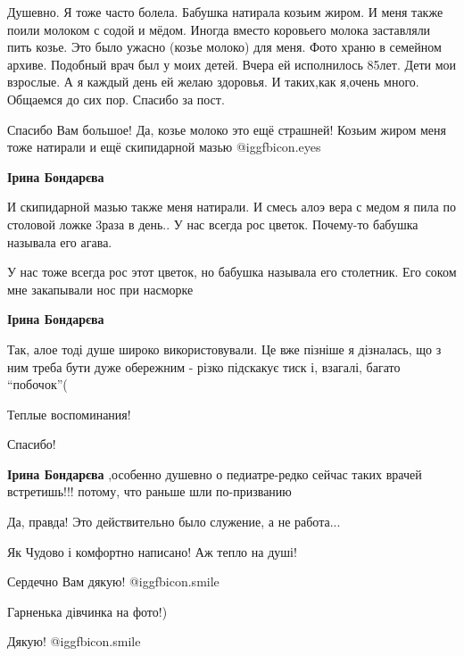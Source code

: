 \begin{itemize}
Душевно. Я тоже часто болела. Бабушка натирала козьим жиром. И меня также поили
молоком с содой и мёдом. Иногда вместо коровьего молока заставляли пить козье.
Это было ужасно (козье молоко) для меня. Фото храню в семейном архиве. Подобный
врач был у моих детей. Вчера ей исполнилось 85лет. Дети мои взрослые. А я
каждый день ей желаю здоровья. И таких,как я,очень много. Общаемся до сих пор.
Спасибо за пост.

\begin{itemize} %

Спасибо Вам большое! Да, козье молоко это ещё страшней! Козьим жиром меня тоже
натирали и ещё скипидарной мазью  @igg{fbicon.eyes} 

\textbf{Ірина Бондарєва} 

И скипидарной мазью также меня натирали. И смесь алоэ вера с медом я пила по
столовой ложке 3раза в день.. У нас всегда рос цветок. Почему-то бабушка
называла его агава.


У нас тоже всегда рос этот цветок, но бабушка называла его столетник. Его соком
мне закапывали нос при насморке

\textbf{Ірина Бондарєва} 

Так, алое тоді душе широко використовували. Це вже пізніше я дізналась, що з
ним треба бути дуже обережним - різко підскакує тиск і, взагалі, багато
\enquote{побочок}(

\end{itemize} %

Теплые воспоминания!

\begin{itemize} %
Спасибо!

\textbf{Ірина Бондарєва} ,особенно душевно о педиатре-редко сейчас таких врачей встретишь!!! потому, что раньше шли по-призванию

Да, правда! Это действительно было служение, а не работа...
\end{itemize} %

Як Чудово і комфортно написано! Аж тепло на душі!

Сердечно Вам дякую! @igg{fbicon.smile} 

Гарненька дівчинка на фото!)

Дякую! @igg{fbicon.smile} 


\end{itemize}
